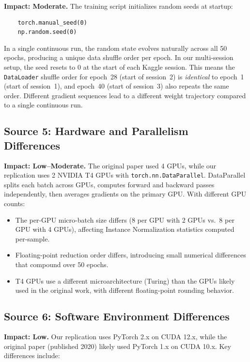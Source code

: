 \documentclass[12pt,a4paper]{article}
\begin{document}
\textbf{Impact: Moderate.} The training script initializes random seeds at startup:

\begin{verbatim}
    torch.manual_seed(0)
    np.random.seed(0)
\end{verbatim}

In a single continuous run, the random state evolves naturally across all 50 epochs, producing a unique data shuffle order per epoch. In our multi-session setup, the seed resets to 0 at the start of each Kaggle session. This means the \texttt{DataLoader} shuffle order for epoch~28 (start of session~2) is \emph{identical} to epoch~1 (start of session~1), and epoch~40 (start of session~3) also repeats the same order. Different gradient sequences lead to a different weight trajectory compared to a single continuous run.

\subsection{Source 5: Hardware and Parallelism Differences}

\textbf{Impact: Low--Moderate.} The original paper used 4 GPUs, while our replication uses 2 NVIDIA T4 GPUs with \texttt{torch.nn.DataParallel}. DataParallel splits each batch across GPUs, computes forward and backward passes independently, then averages gradients on the primary GPU. With different GPU counts:

\begin{itemize}[nosep]
    \item The per-GPU micro-batch size differs (8 per GPU with 2 GPUs vs.\ 8 per GPU with 4 GPUs), affecting Instance Normalization statistics computed per-sample.
    \item Floating-point reduction order differs, introducing small numerical differences that compound over 50 epochs.
    \item T4 GPUs use a different microarchitecture (Turing) than the GPUs likely used in the original work, with different floating-point rounding behavior.
\end{itemize}

\subsection{Source 6: Software Environment Differences}

\textbf{Impact: Low.} Our replication uses PyTorch 2.x on CUDA 12.x, while the original paper (published 2020) likely used PyTorch 1.x on CUDA 10.x. Key differences include:
\end{document}
